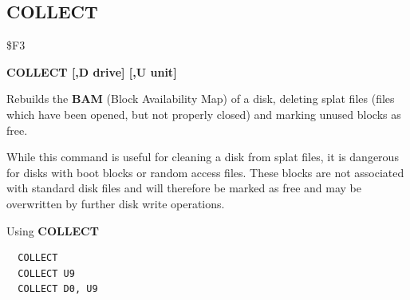 \subsection{COLLECT}
\begin{description}[leftmargin=2cm,style=nextline]
\item [Token:] \$F3
\item [Format:] {\bf COLLECT [,D drive] [,U unit] }
\item [Usage:]
   Rebuilds the {\bf BAM}
   (Block Availability Map) of a disk, deleting splat files (files which have been opened,
   but not properly closed) and marking unused blocks as free.

   \drivedefinition

   \unitdefinition

\item [Remarks:]
   While this command is useful for cleaning a disk from
   splat files, it is dangerous for disks with boot blocks or random access files.
   These blocks are not associated with standard disk files
   and will therefore be marked as free and may be overwritten
   by further disk write operations.

\item [Examples:] Using {\bf COLLECT}
\begin{tcolorbox}[colback=black,coltext=white]
\verbatimfont{\codefont}
\begin{verbatim}
  COLLECT
  COLLECT U9
  COLLECT D0, U9
\end{verbatim}
\end{tcolorbox}
\end{description}


\newpage

